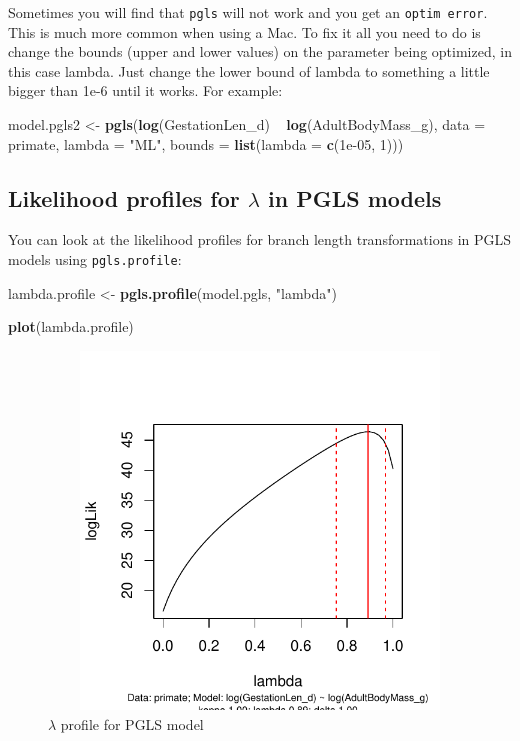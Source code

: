 \documentclass[12pt]{article}
\newcommand{\KeywordTok}[1]{\textcolor[rgb]{0.13,0.29,0.53}{\textbf{{#1}}}}
\newcommand{\DataTypeTok}[1]{\textcolor[rgb]{0.13,0.29,0.53}{{#1}}}
\newcommand{\DecValTok}[1]{\textcolor[rgb]{0.00,0.00,0.81}{{#1}}}
\newcommand{\FloatTok}[1]{\textcolor[rgb]{0.00,0.00,0.81}{{#1}}}
\newcommand{\StringTok}[1]{\textcolor[rgb]{0.31,0.60,0.02}{{#1}}}
\newcommand{\NormalTok}[1]{{#1}}
\begin{document}
\newpage
\begin{framed}
Sometimes you will find that \texttt{pgls} will not work and you get an \texttt{optim error}. This is much more common when using a Mac. To fix it all you need to do is change the bounds (upper and lower values) on the parameter being optimized, in this case lambda. Just change the lower bound of lambda to something a little bigger than 1e-6 until it works. For example:

\begin{snugshade}
\begin{Highlighting}[]
\NormalTok{model.pgls2 <-}\StringTok{ }\KeywordTok{pgls}\NormalTok{(}\KeywordTok{log}\NormalTok{(GestationLen_d) ~}\StringTok{ }\KeywordTok{log}\NormalTok{(AdultBodyMass_g), }
                    \DataTypeTok{data =} \NormalTok{primate, }\DataTypeTok{lambda =} \StringTok{"ML"}\NormalTok{, }
                    \DataTypeTok{bounds =} \KeywordTok{list}\NormalTok{(}\DataTypeTok{lambda =} \KeywordTok{c}\NormalTok{(}\FloatTok{1e-05}\NormalTok{, }\DecValTok{1}\NormalTok{)))}
\end{Highlighting}
\end{snugshade}
\end{framed}

\subsection{Likelihood profiles for $\lambda$ in PGLS models}

You can look at the likelihood profiles for branch length transformations in PGLS models using \texttt{pgls.profile}:

\begin{snugshade}
\begin{Highlighting}[]
\NormalTok{lambda.profile <-}\StringTok{ }\KeywordTok{pgls.profile}\NormalTok{(model.pgls, }\StringTok{"lambda"}\NormalTok{)}

\KeywordTok{plot}\NormalTok{(lambda.profile)}
\end{Highlighting}
\end{snugshade}

\begin{figure}[H]
\centering
\includegraphics[width = 30cm, height = 9.5cm, keepaspectratio=true]{lambdaplot.pdf}
\caption{$\lambda$ profile for PGLS model}
\label{figure}
\end{figure}
\end{document}
